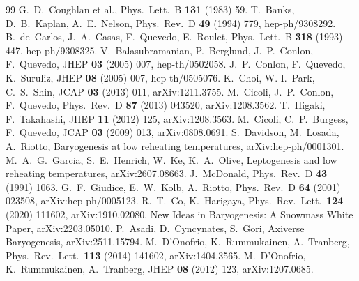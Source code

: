 \documentclass[11pt]{article}
\begin{document}
\begin{thebibliography}{99}
 G.~D.~Coughlan et al., Phys.\ Lett.\ B \textbf{131} (1983) 59.
 T.~Banks, D.~B.~Kaplan, A.~E.~Nelson, Phys.\ Rev.\ D \textbf{49} (1994) 779, hep-ph/9308292.
 B.~de~Carlos, J.~A.~Casas, F.~Quevedo, E.~Roulet, Phys.\ Lett.\ B \textbf{318} (1993) 447, hep-ph/9308325.
 V.~Balasubramanian, P.~Berglund, J.~P.~Conlon, F.~Quevedo, JHEP \textbf{03} (2005) 007, hep-th/0502058.
 J.~P.~Conlon, F.~Quevedo, K.~Suruliz, JHEP \textbf{08} (2005) 007, hep-th/0505076.
 K.~Choi, W.-I.~Park, C.~S.~Shin, JCAP \textbf{03} (2013) 011, arXiv:1211.3755.
 M.~Cicoli, J.~P.~Conlon, F.~Quevedo, Phys.\ Rev.\ D \textbf{87} (2013) 043520, arXiv:1208.3562.
 T.~Higaki, F.~Takahashi, JHEP \textbf{11} (2012) 125, arXiv:1208.3563.
 M.~Cicoli, C.~P.~Burgess, F.~Quevedo, JCAP \textbf{03} (2009) 013, arXiv:0808.0691.
 S.~Davidson, M.~Losada, A.~Riotto, Baryogenesis at low reheating temperatures, arXiv:hep-ph/0001301.
 M.~A.~G.~Garcia, S.~E.~Henrich, W.~Ke, K.~A.~Olive, Leptogenesis and low reheating temperatures, arXiv:2607.08663.
 J.~McDonald, Phys.\ Rev.\ D \textbf{43} (1991) 1063.
 G.~F.~Giudice, E.~W.~Kolb, A.~Riotto, Phys.\ Rev.\ D \textbf{64} (2001) 023508, arXiv:hep-ph/0005123.
 R.~T.~Co, K.~Harigaya, Phys.\ Rev.\ Lett.\ \textbf{124} (2020) 111602, arXiv:1910.02080.
 New Ideas in Baryogenesis: A Snowmass White Paper, arXiv:2203.05010.
 P.~Asadi, D.~Cyncynates, S.~Gori, Axiverse Baryogenesis, arXiv:2511.15794.
 M.~D'Onofrio, K.~Rummukainen, A.~Tranberg, Phys.\ Rev.\ Lett.\ \textbf{113} (2014) 141602, arXiv:1404.3565.
 M.~D'Onofrio, K.~Rummukainen, A.~Tranberg, JHEP \textbf{08} (2012) 123, arXiv:1207.0685.
\end{thebibliography}
\end{document}
